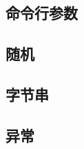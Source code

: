\documentclass[./main.tex]{subfiles}
\begin{document}
\subsection*{命令行参数}


\subsection*{随机}


\subsection*{字节串}


\subsection*{异常}

\end{document}
